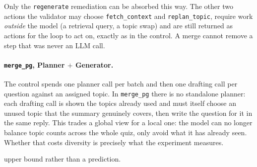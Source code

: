 Only the \texttt{regenerate} remediation can be absorbed this way. The other two
actions the validator may choose \texttt{fetch\_context} and
\texttt{replan\_topic}, require work \emph{outside} the model (a retrieval
query, a topic swap) and are still returned as actions for the loop to act on,
exactly as in the control. A merge cannot remove a step that was never an LLM
call.

\paragraph{\texttt{merge\_pg}, Planner $+$ Generator.} The control spends one
planner call per batch and then one drafting call per question against an
assigned topic. In \texttt{merge\_pg} there is no standalone planner: each
drafting call is shown the topics already used and must itself choose an unused
topic that the summary genuinely covers, then write the question for it in the
same reply. This trades a global view for a local one: the model can no
longer balance topic counts across the whole quiz, only avoid what it has
already seen. Whether that costs diversity is precisely what the experiment
measures.



upper bound rather than a prediction.

